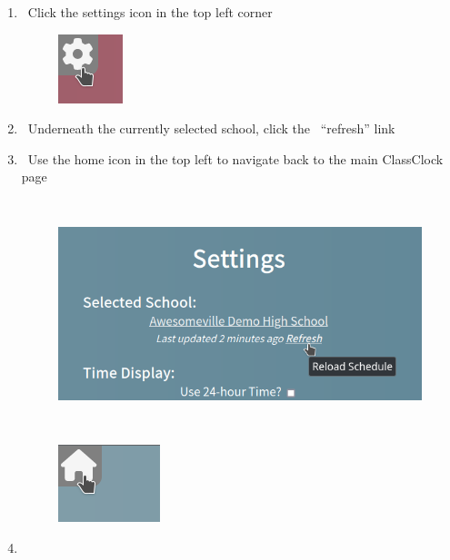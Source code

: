 \documentclass{article}
\begin{document}
\begin{enumerate}
\item {
\ Click the settings icon in the top left corner}
\begin{figure}
\includegraphics[width=0.7398in,height=0.7917in]{Mini20Manual-img014.png}\end{figure}
\item {
\ Underneath the currently selected school, click the \ “refresh” link }
\item {
\ Use the home icon in the top left to navigate back to the main ClassClock page}
\begin{figure}
\includegraphics[width=5.511in,height=2.6335in]{Mini20Manual-img015.png}\end{figure}
\begin{figure}
\includegraphics[width=1.1661in,height=0.8846in]{Mini20Manual-img016.png}\end{figure}
\item {}
\begin{figure}

\end{figure}
\end{enumerate}
\end{document}
